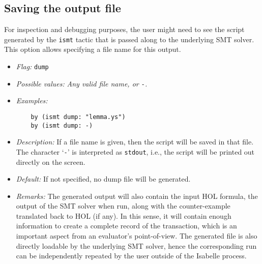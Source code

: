 \documentclass{article}
\begin{document}
\subsection{Saving the output file}
For inspection and debugging purposes, the user might need to see the script generated by the 
{\tt ismt} tactic that is passed along to the underlying SMT solver.
This option allows specifying a file name for this output.
\begin{itemize}
\item {\em Flag:} {\tt dump}
\item {\em Possible values:} {\em Any valid file name, or {\tt -}.}
\item {\em Examples:} 
\begin{verbatim}
    by (ismt dump: "lemma.ys")
    by (ismt dump: -)
\end{verbatim}
\item {\em Description:} If a file name is given, then the script will be saved in that file. The 
character `{\tt -}' is
interpreted as {\tt stdout}, i.e., the script will be printed out directly on the screen. 
\item {\em Default:} If not specified, no dump file will be generated.
\item {\em Remarks:} The generated output will also contain the input HOL formula, the output of the SMT solver
when run, along with the counter-example translated back to HOL (if any). In this sense, it will contain enough
information to create a complete record of the transaction, which is an important aspect from an evaluator's
point-of-view. The generated file is also directly loadable by the underlying SMT solver, hence the corresponding
run can be independently repeated by the user outside of the Isabelle process.
\end{itemize}
\end{document}
